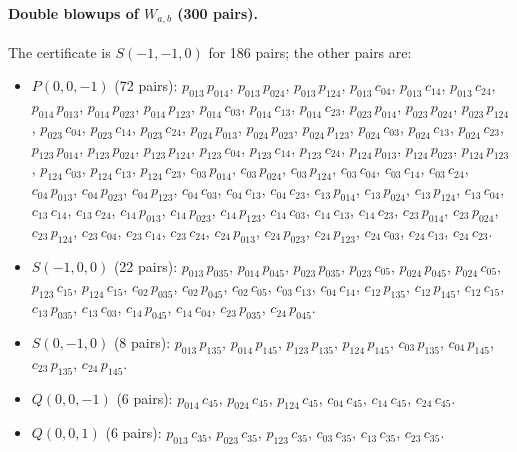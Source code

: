 \documentclass[12pt]{article}
\begin{document}
{\paragraph{Double blowups of $W_{a,b}$ (300 pairs).} The certificate is $S(-1,-1,0)$ for 186 pairs; the other pairs are:
\begin{itemize}
\item $P(0,0,-1)$ (72 pairs): $p_{013}\,p_{014}$, $p_{013}\,p_{024}$, $p_{013}\,p_{124}$, $p_{013}\,c_{04}$, $p_{013}\,c_{14}$, $p_{013}\,c_{24}$, $p_{014}\,p_{013}$, $p_{014}\,p_{023}$, $p_{014}\,p_{123}$, $p_{014}\,c_{03}$, $p_{014}\,c_{13}$, $p_{014}\,c_{23}$, $p_{023}\,p_{014}$, $p_{023}\,p_{024}$, $p_{023}\,p_{124}$, $p_{023}\,c_{04}$, $p_{023}\,c_{14}$, $p_{023}\,c_{24}$, $p_{024}\,p_{013}$, $p_{024}\,p_{023}$, $p_{024}\,p_{123}$, $p_{024}\,c_{03}$, $p_{024}\,c_{13}$, $p_{024}\,c_{23}$, $p_{123}\,p_{014}$, $p_{123}\,p_{024}$, $p_{123}\,p_{124}$, $p_{123}\,c_{04}$, $p_{123}\,c_{14}$, $p_{123}\,c_{24}$, $p_{124}\,p_{013}$, $p_{124}\,p_{023}$, $p_{124}\,p_{123}$, $p_{124}\,c_{03}$, $p_{124}\,c_{13}$, $p_{124}\,c_{23}$, $c_{03}\,p_{014}$, $c_{03}\,p_{024}$, $c_{03}\,p_{124}$, $c_{03}\,c_{04}$, $c_{03}\,c_{14}$, $c_{03}\,c_{24}$, $c_{04}\,p_{013}$, $c_{04}\,p_{023}$, $c_{04}\,p_{123}$, $c_{04}\,c_{03}$, $c_{04}\,c_{13}$, $c_{04}\,c_{23}$, $c_{13}\,p_{014}$, $c_{13}\,p_{024}$, $c_{13}\,p_{124}$, $c_{13}\,c_{04}$, $c_{13}\,c_{14}$, $c_{13}\,c_{24}$, $c_{14}\,p_{013}$, $c_{14}\,p_{023}$, $c_{14}\,p_{123}$, $c_{14}\,c_{03}$, $c_{14}\,c_{13}$, $c_{14}\,c_{23}$, $c_{23}\,p_{014}$, $c_{23}\,p_{024}$, $c_{23}\,p_{124}$, $c_{23}\,c_{04}$, $c_{23}\,c_{14}$, $c_{23}\,c_{24}$, $c_{24}\,p_{013}$, $c_{24}\,p_{023}$, $c_{24}\,p_{123}$, $c_{24}\,c_{03}$, $c_{24}\,c_{13}$, $c_{24}\,c_{23}$.
\item $S(-1,0,0)$ (22 pairs): $p_{013}\,p_{035}$, $p_{014}\,p_{045}$, $p_{023}\,p_{035}$, $p_{023}\,c_{05}$, $p_{024}\,p_{045}$, $p_{024}\,c_{05}$, $p_{123}\,c_{15}$, $p_{124}\,c_{15}$, $c_{02}\,p_{035}$, $c_{02}\,p_{045}$, $c_{02}\,c_{05}$, $c_{03}\,c_{13}$, $c_{04}\,c_{14}$, $c_{12}\,p_{135}$, $c_{12}\,p_{145}$, $c_{12}\,c_{15}$, $c_{13}\,p_{035}$, $c_{13}\,c_{03}$, $c_{14}\,p_{045}$, $c_{14}\,c_{04}$, $c_{23}\,p_{035}$, $c_{24}\,p_{045}$.
\item $S(0,-1,0)$ (8 pairs): $p_{013}\,p_{135}$, $p_{014}\,p_{145}$, $p_{123}\,p_{135}$, $p_{124}\,p_{145}$, $c_{03}\,p_{135}$, $c_{04}\,p_{145}$, $c_{23}\,p_{135}$, $c_{24}\,p_{145}$.
\item $Q(0,0,-1)$ (6 pairs): $p_{014}\,c_{45}$, $p_{024}\,c_{45}$, $p_{124}\,c_{45}$, $c_{04}\,c_{45}$, $c_{14}\,c_{45}$, $c_{24}\,c_{45}$.
\item $Q(0,0,1)$ (6 pairs): $p_{013}\,c_{35}$, $p_{023}\,c_{35}$, $p_{123}\,c_{35}$, $c_{03}\,c_{35}$, $c_{13}\,c_{35}$, $c_{23}\,c_{35}$.
\end{itemize}
}
\end{document}
